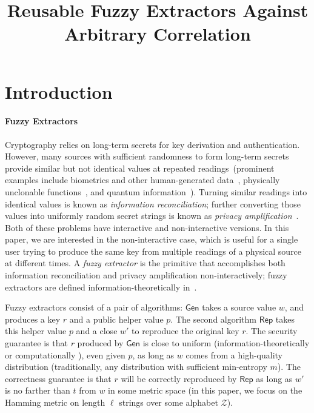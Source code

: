 \documentclass[11pt]{article}
\title{Reusable Fuzzy Extractors Against Arbitrary Correlation}
\newcommand{\class}[1]{{\ensuremath{\mathsf{#1}}}}
\newcommand{\gen}{\ensuremath{\class{Gen}}\xspace}
\newcommand{\rep}{\ensuremath{\class{Rep}}\xspace}
\begin{document}
\maketitle


%


\section{Introduction}\label{sec:introduction}

\paragraph{Fuzzy Extractors}
Cryptography relies on long-term secrets for key derivation and authentication. However, many sources with sufficient randomness to form long-term secrets provide similar but not identical values at repeated readings~(prominent examples include biometrics and other human-generated data~\cite{daugman2004,zviran1993comparison,brostoff2000passfaces,ellison2000protecting,mayrhofer2009shake,monrose2002password},
physically unclonable functions~\cite{pappu2002physical,tuyls2006puf,gassend2002silicon,suh2007physical},
and quantum information~\cite{bennett1988privacy}). Turning similar readings into identical values is known as \emph{information reconciliation}; further converting those values into uniformly random secret strings is known as \emph{privacy amplification}~\cite{bennett1988privacy}.
Both of these problems have interactive and non-interactive versions.  In this paper, we are interested in the non-interactive case, which is useful for a single user trying to produce the same key from multiple readings of a physical source at different times.
 A \emph{fuzzy extractor} is the primitive that accomplishes both information reconciliation and privacy amplification non-interactively; fuzzy extractors are defined information-theoretically in~\cite{DBLP:journals/siamcomp/DodisORS08}.


Fuzzy extractors consist of a pair of algorithms: \gen takes a source value $w$, and produces a key $r$ and a public helper value $p$.  The second algorithm \rep takes this helper value $p$ and a close $w'$ to reproduce the original key $r$.  The security guarantee is that $r$ produced by \gen is close to uniform (information-theoretically \cite{DBLP:journals/siamcomp/DodisORS08} or computationally \cite{fuller2013computational}), even given $p$, as long as $w$ comes from a high-quality distribution (traditionally, any distribution with sufficient min-entropy $m$). The correctness guarantee is that $r$ will be correctly reproduced by \rep as long as $w'$ is no farther than $t$ from $w$ in some metric space (in this paper, we focus on the Hamming metric on length $\ell$ strings over some alphabet $\mathcal{Z}$).
\end{document}
